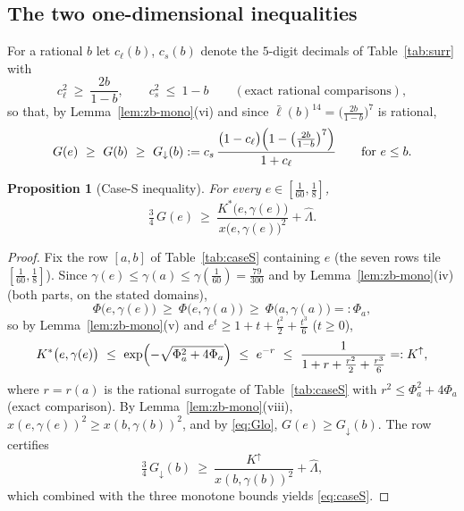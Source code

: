 \documentclass[11pt]{article}
\newtheorem{proposition}[theorem]{Proposition}
\theoremstyle{remark}
\theoremstyle{plain}
\theoremstyle{plain}
\newcommand{\Kstar}{K^{*}}
\newcommand{\lbar}{\bar\ell}
\begin{document}
\subsection{The two one-dimensional inequalities}

For a rational $b$ let $c_\ell(b)$, $c_s(b)$ denote the $5$-digit decimals
of Table~\ref{tab:surr} with
\begin{equation}\label{eq:surr}
        c_\ell^2\ \ge\ \frac{2b}{1-b},
        \qquad
        c_s^2\ \le\ 1-b
        \qquad(\text{exact rational comparisons}),
\end{equation}
so that, by Lemma~\ref{lem:zb-mono}(vi) and since
$\lbar(b)^{14}=\bigl(\tfrac{2b}{1-b}\bigr)^7$ is rational,
\begin{equation}\label{eq:Glo}
        G(e)\ \ge\ G(b)\ \ge\
        G_\downarrow(b):=c_s\,
        \frac{\bigl(1-c_\ell\bigr)\Bigl(1-\bigl(\tfrac{2b}{1-b}\bigr)^{7}\Bigr)}
        {1+c_\ell}
        \qquad\text{for } e\le b .
\end{equation}

\begin{proposition}[Case-S inequality]\label{prop:caseS}
For every $e\in[\tfrac1{60},\tfrac18]$,
\begin{equation}\label{eq:caseS}
        \tfrac34\,G(e)\ \ge\
        \frac{\Kstar\bigl(e,\gamma(e)\bigr)}{x\bigl(e,\gamma(e)\bigr)^2}
        +\widehat\Lambda .
\end{equation}
\end{proposition}

\begin{proof}
Fix the row $[a,b]$ of Table~\ref{tab:caseS} containing $e$ (the seven rows
tile $[\tfrac1{60},\tfrac18]$).  Since $\gamma(e)\le\gamma(a)\le
\gamma(\tfrac1{60})=\tfrac{79}{300}$ and by
Lemma~\ref{lem:zb-mono}(iv) (both parts, on the stated domains),
\[
        \Phi\bigl(e,\gamma(e)\bigr)\ \ge\ \Phi\bigl(e,\gamma(a)\bigr)
        \ \ge\ \Phi\bigl(a,\gamma(a)\bigr)=:\Phi_a ,
\]
so by Lemma~\ref{lem:zb-mono}(v) and $e^t\ge1+t+\tfrac{t^2}2+\tfrac{t^3}6$
($t\ge0$),
\[
        \Kstar\bigl(e,\gamma(e)\bigr)
        \ \le\ \exp\Bigl(-\sqrt{\Phi_a^2+4\Phi_a}\Bigr)
        \ \le\ e^{-r}
        \ \le\ \frac1{1+r+\frac{r^2}2+\frac{r^3}6}=:K^{\uparrow},
\]
where $r=r(a)$ is the rational surrogate of Table~\ref{tab:caseS} with
$r^2\le\Phi_a^2+4\Phi_a$ (exact comparison).  By
Lemma~\ref{lem:zb-mono}(viii), $x(e,\gamma(e))^2\ge x(b,\gamma(b))^2$, and by
\eqref{eq:Glo}, $G(e)\ge G_\downarrow(b)$.  The row certifies
\[
        \tfrac34\,G_\downarrow(b)\ \ge\
        \frac{K^{\uparrow}}{x(b,\gamma(b))^2}+\widehat\Lambda,
\]
which combined with the three monotone bounds yields \eqref{eq:caseS}.
\end{proof}
\end{document}
